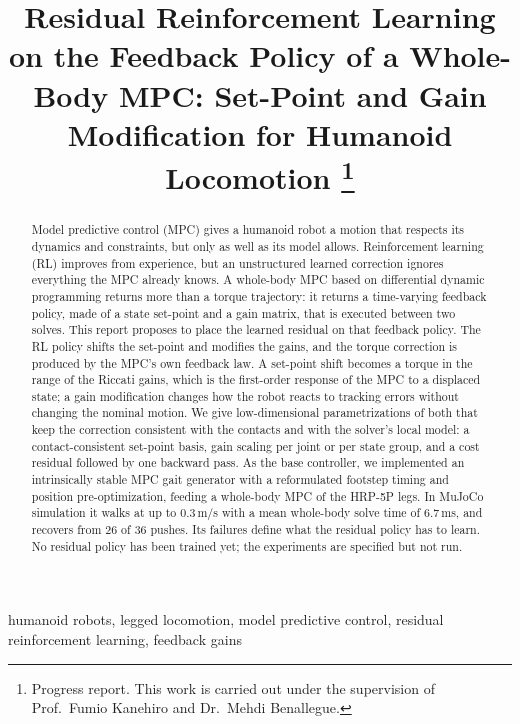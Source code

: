 \documentclass[conference]{IEEEtran}
\begin{document}
\title{Residual Reinforcement Learning on the Feedback Policy of a Whole-Body MPC: Set-Point and Gain Modification for Humanoid Locomotion%
\thanks{Progress report. This work is carried out under the supervision of Prof.~Fumio Kanehiro and Dr.~Mehdi Benallegue.}}

\author{
}

\maketitle

\begin{abstract}
Model predictive control (MPC) gives a humanoid robot a motion that respects its dynamics and constraints, but only as well as its model allows.
Reinforcement learning (RL) improves from experience, but an unstructured learned correction ignores everything the MPC already knows.
A whole-body MPC based on differential dynamic programming returns more than a torque trajectory: it returns a time-varying feedback policy, made of a state set-point and a gain matrix, that is executed between two solves.
This report proposes to place the learned residual on that feedback policy.
The RL policy shifts the set-point and modifies the gains, and the torque correction is produced by the MPC's own feedback law.
A set-point shift becomes a torque in the range of the Riccati gains, which is the first-order response of the MPC to a displaced state; a gain modification changes how the robot reacts to tracking errors without changing the nominal motion.
We give low-dimensional parametrizations of both that keep the correction consistent with the contacts and with the solver's local model: a contact-consistent set-point basis, gain scaling per joint or per state group, and a cost residual followed by one backward pass.
As the base controller, we implemented an intrinsically stable MPC gait generator with a reformulated footstep timing and position pre-optimization, feeding a whole-body MPC of the HRP-5P legs.
In MuJoCo simulation it walks at up to 0.3\,m/s with a mean whole-body solve time of 6.7\,ms, and recovers from 26 of 36 pushes.
Its failures define what the residual policy has to learn.
No residual policy has been trained yet; the experiments are specified but not run.
\end{abstract}

\begin{IEEEkeywords}
humanoid robots, legged locomotion, model predictive control, residual reinforcement learning, feedback gains
\end{IEEEkeywords}
\end{document}
